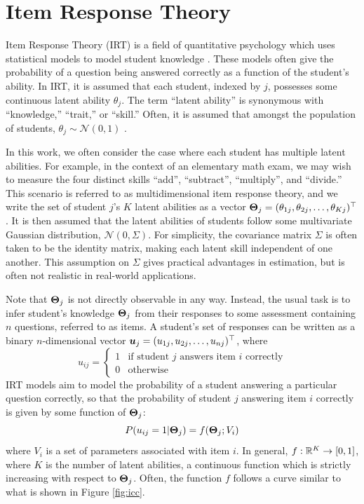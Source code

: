 \section{Item Response Theory}\label{sec:irt}
Item Response Theory (IRT) is a field of quantitative psychology which uses statistical models to model student knowledge \cite{lord1968}. These models often give the probability of a question being answered correctly as a function of the student's ability. In IRT, it is assumed that each student, indexed by $j$, possesses some continuous latent ability $\theta_j$. The term ``latent ability'' is synonymous with ``knowledge,'' ``trait,'' or ``skill.'' Often, it is assumed that amongst the population of students, $\theta_j \sim \mathcal{N}(0,1)$ \cite{thissen}. 

In this work, we often consider the case where each student has multiple latent abilities. For example, in the context of an elementary math exam, we may wish to measure the four distinct skills ``add'', ``subtract'', ``multiply'', and ``divide.'' This scenario is referred to as multidimensional item response theory, and we write the set of student $j$'s $K$ latent abilities as a vector $\boldsymbol{\Theta}_j = (\theta_{1j}, \theta_{2j}, \ldots, \theta_{Kj})^\top$. It is then assumed that the latent abilities of students follow some multivariate Gaussian distribution, $\mathcal{N}(0, \Sigma)$. For simplicity, the covariance matrix $\Sigma$ is often taken to be the identity matrix, making each latent skill independent of one another. This assumption on $\Sigma$ gives practical advantages in estimation, but is often not realistic in real-world applications.

Note that $\boldsymbol{\Theta}_j$ is not directly observable in any way. Instead, the usual task is to infer student's knowledge $\boldsymbol{\Theta}_j$ from their responses to some assessment containing $n$ questions, referred to as items. A student's set of responses can be written as a binary $n$-dimensional vector $\boldsymbol{u}_j = (u_{1j}, u_{2j}, \ldots, u_{nj})^\top$, where 
\begin{equation}
  u_{ij} = \begin{cases} 1 & \text{if student } j \text{ answers item } i \text{ correctly} \\0 & \text{otherwise} \end{cases} 
  \label{eq:responses}
\end{equation}
IRT models aim to model the probability of a student answering a particular question correctly, so that the probability of student $j$ answering item $i$ correctly is given by some function of $\boldsymbol{\Theta}_j$:
\begin{equation}
  P(u_{ij} = 1 | \boldsymbol{\Theta}_j) = f(\boldsymbol{\Theta}_j; V_i)
  \label{eq:item_response_prob}
\end{equation}
where $V_i$ is a set of parameters associated with item $i$. In general, $f:\mathbb{R}^K \to [0,1]$, where $K$ is the number of latent abilities, a continuous function which is strictly increasing with respect to $\boldsymbol{\Theta}_j$. Often, the function $f$ follows a curve similar to what is shown in Figure \ref{fig:icc}.

